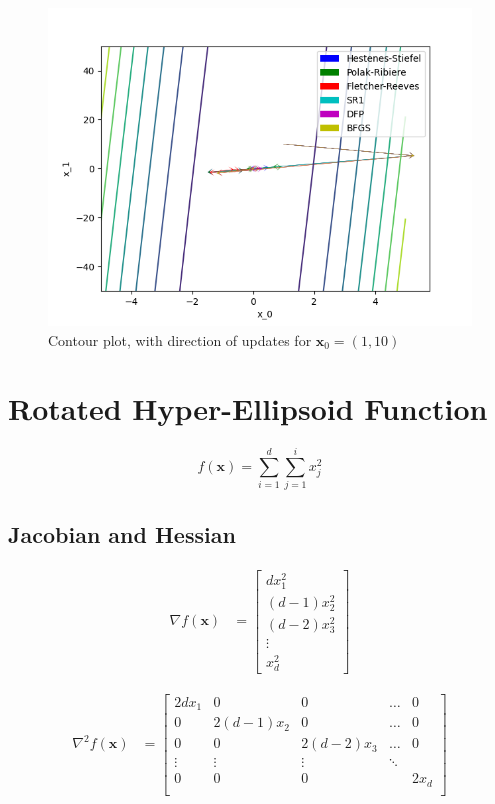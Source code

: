 \documentclass[a4paper]{article}
\begin{document}
\begin{figure}[H]
    \centering
    \includegraphics[width=.65\textwidth]{matyas_function_cont.png}
    \caption{Contour plot, with direction of updates for $\textbf{x}_0 = (1, 10)$}
\end{figure}

\section{Rotated Hyper-Ellipsoid Function}

$$f(\textbf{x}) = \sum_{i=1}^d \sum_{j=1}^i x_j^2$$

\subsection{Jacobian and Hessian}

\begin{align*}
\nabla f(\textbf{x}) &=
    \begin{bmatrix}
        d x_1^2 \\
        (d - 1) x_2^2 \\
        (d - 2) x_3^2 \\
        \vdots \\
        x_d^2
    \end{bmatrix}
\end{align*}

\begin{align*}
\nabla^2 f(\textbf{x}) &=
    \begin{bmatrix}
        2dx_1 & 0 & 0 & \dots & 0 \\
        0 & 2(d - 1)x_2 & 0 & \dots & 0 \\
        0 & 0 & 2(d - 2)x_3 & \dots & 0 \\
        \vdots & \vdots & \vdots & \ddots & \\
        0 & 0 & 0 & & 2x_d \\
    \end{bmatrix}
\end{align*}
\end{document}

